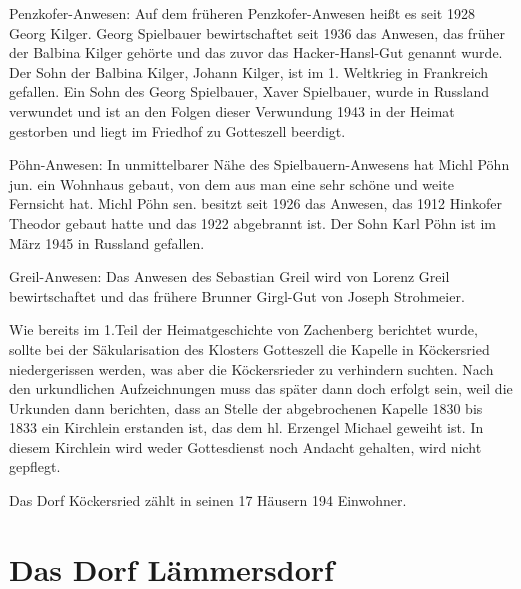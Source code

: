 \documentclass[12pt,a4pager]{book}
\begin{document}
Penzkofer-Anwesen: Auf dem früheren Penzkofer-Anwesen heißt es seit 1928 Georg
Kilger. Georg Spielbauer bewirtschaftet seit 1936 das Anwesen, das früher der
Balbina Kilger gehörte und das zuvor das Hacker-Hansl-Gut genannt wurde. Der
Sohn der Balbina Kilger, Johann Kilger, ist im 1. Weltkrieg in Frankreich
gefallen. Ein Sohn des Georg Spielbauer, Xaver Spielbauer, wurde in Russland
verwundet und ist an den Folgen dieser Verwundung 1943 in der Heimat gestorben
und liegt im Friedhof zu Gotteszell beerdigt.

Pöhn-Anwesen: In unmittelbarer Nähe des Spielbauern-Anwesens hat Michl Pöhn jun.
ein Wohnhaus gebaut, von dem aus man eine sehr schöne und weite Fernsicht hat.
Michl Pöhn sen. besitzt seit 1926 das Anwesen, das 1912 Hinkofer Theodor gebaut
hatte und das 1922 abgebrannt ist. Der Sohn Karl Pöhn ist im März 1945 in
Russland gefallen.

Greil-Anwesen: Das Anwesen des Sebastian Greil wird von Lorenz Greil
bewirtschaftet und das frühere Brunner Girgl-Gut von Joseph Strohmeier.

Wie bereits im 1.Teil der Heimatgeschichte von Zachenberg berichtet wurde,
sollte bei der Säkularisation des Klosters Gotteszell die Kapelle in Köckersried
niedergerissen werden, was aber die Köckersrieder zu verhindern suchten. Nach
den urkundlichen Aufzeichnungen muss das später dann doch erfolgt sein, weil die
Urkunden dann berichten, dass an Stelle der abgebrochenen Kapelle 1830 bis 1833
ein Kirchlein erstanden ist, das dem hl. Erzengel Michael geweiht ist. In diesem
Kirchlein wird weder Gottesdienst noch Andacht gehalten, wird nicht gepflegt.

Das Dorf Köckersried zählt in seinen 17 Häusern 194 Einwohner.

\section{Das Dorf Lämmersdorf}
\end{document}
